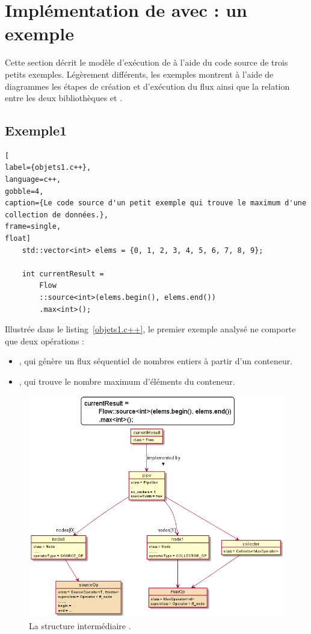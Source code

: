 \section{Impl\'ementation de  avec  : un exemple}

Cette section d\'ecrit le mod\`ele d'ex\'ecution de  \`a l'aide du code source de trois petits exemples. L\'eg\`erement diff\'erents, les exemples montrent \`a l'aide de diagrammes les \'etapes de cr\'eation et d'exécution du flux ainsi que la relation entre les deux biblioth\`eques  et .


\subsection{Exemple1} 


\begin{lstlisting}[
label={objets1.c++},
language=c++,
gobble=4,
caption={Le code source d'un petit exemple qui trouve le maximum d'une collection de données.},
frame=single,
float]
    std::vector<int> elems = {0, 1, 2, 3, 4, 5, 6, 7, 8, 9};

    int currentResult =
        Flow
        ::source<int>(elems.begin(), elems.end())
        .max<int>();
\end{lstlisting}

Illustr\'ee dans le listing~\ref{objets1.c++}, le premier exemple analys\'e ne comporte que deux op\'erations :

\begin{itemize}
\item {}, qui g\'en\`ere un flux s\'equentiel de nombres entiers \`a partir d'un conteneur.
\item {}, qui trouve le nombre maximum d'\'el\'ements du conteneur. 
\end{itemize}


\begin{figure}
\centering
         \includegraphics[width=1.0\textwidth]{Figures/objets1-ppff.png}
      \caption{La structure interm\'ediaire .}
       \label{objets1-ppff.fig}
\end{figure}


